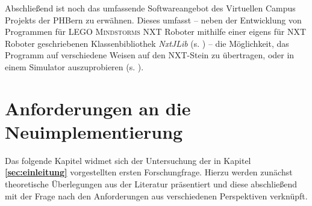 \documentclass[paper=a4, DIV=calc, BCOR=12mm, twoside=on, onecolumn=on, open = right, titlepage =on, parskip =half-, headsepline = on, footsepline = off, chapterprefix = off, appendixprefix = on, fontsize = 12pt, numbers = noenddot, abstract = on]{scrbook}
\begin{document}
Abschließend ist noch das umfassende Softwareangebot des Virtuellen Campus Projekts der PHBern zu erwähnen. Dieses umfasst -- neben der Entwicklung von Programmen für \textsc{LEGO Mindstorms} NXT Roboter mithilfe einer eigens für NXT Roboter geschriebenen Klassenbibliothek \emph{NxtJLib} (s. \cite{aegidius:16}) -- die Möglichkeit, das Programm auf verschiedene Weisen auf den NXT-Stein zu übertragen, oder in einem Simulator auszuprobieren (s. \cite{phbern}). 

\singlespacing
\chapter{Anforderungen an die Neu\-im\-ple\-men\-tie\-rung}
\label{chap:anforderungen}
\onehalfspacing
Das folgende Kapitel widmet sich der Untersuchung der in Kapitel \textbf{\ref{sec:einleitung}} vorgestellten ersten Forschungfrage. Hierzu werden zunächst theoretische Überlegungen aus der Literatur präsentiert und diese abschließend mit der Frage nach den Anforderungen aus verschiedenen Perspektiven verknüpft.
\end{document}
